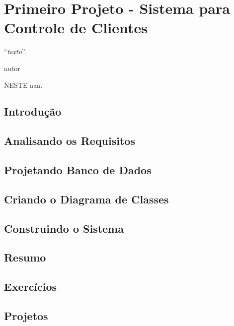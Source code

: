 \chapter{Primeiro Projeto - Sistema para Controle de Clientes}
\epigraph{``\textit{texto}''.}{autor}

\lettrine[lines=4, lhang=0.1, lraise=0, loversize=0.2, findent=0.1em]{\textcolor{corAzulTema}{N}}{ESTE} aaa.

\section{Introdução}

\section{Analisando os Requisitos}

\section{Projetando Banco de Dados}

\section{Criando o Diagrama de Classes}

\section{Construindo o Sistema}

\section{Resumo}

\section{Exercícios}

\section{Projetos}